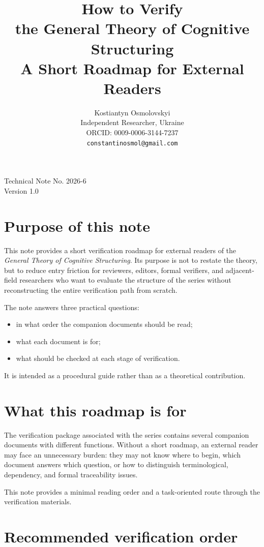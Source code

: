 \documentclass[11pt,a4paper]{article}
\title{How to Verify\\ the General Theory of Cognitive Structuring\\
	\large A Short Roadmap for External Readers}
\author{
	Kostiantyn Osmolovskyi\\
	\small Independent Researcher, Ukraine\\
	\small ORCID: 0009-0006-3144-7237\\
	\small \texttt{constantinosmol@gmail.com}
}
\date{}
\begin{document}
	\maketitle

\begin{center}
	\small
	Technical Note No. 2026-6\\
	Version 1.0
\end{center}

\vspace{0.5em}
	
	
\section{Purpose of this note}

This note provides a short verification roadmap for external readers of the
\emph{General Theory of Cognitive Structuring}. Its purpose is not to restate the theory,
but to reduce entry friction for reviewers, editors, formal verifiers, and adjacent-field
researchers who want to evaluate the structure of the series without reconstructing the entire
verification path from scratch.

The note answers three practical questions:
\begin{itemize}[leftmargin=2em]
	\item in what order the companion documents should be read;
	\item what each document is for;
	\item what should be checked at each stage of verification.
\end{itemize}

It is intended as a procedural guide rather than as a theoretical contribution.

\section{What this roadmap is for}

The verification package associated with the series contains several companion documents with different functions. Without a short roadmap, an external reader may face an unnecessary burden: they may not know where to begin, which document answers which question, or how to distinguish terminological, dependency, and formal traceability issues.

This note provides a minimal reading order and a task-oriented route through the verification materials.

\section{Recommended verification order}
\end{document}
